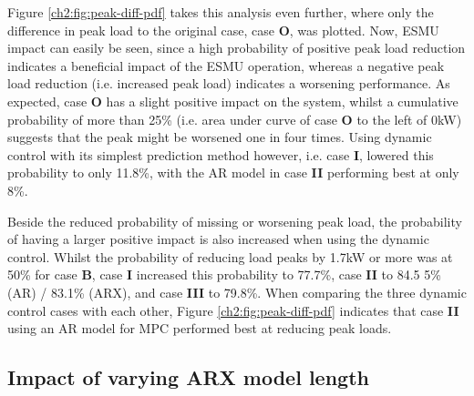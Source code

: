 

Figure \ref{ch2:fig:peak-diff-pdf} takes this analysis even further, where only the difference in peak load to the original case, case \textbf{O}, was plotted.
Now, ESMU impact can easily be seen, since a high probability of positive peak load reduction indicates a beneficial impact of the ESMU operation, whereas a negative peak load reduction (i.e. increased peak load) indicates a worsening performance.
As expected, case \textbf{O} has a slight positive impact on the system, whilst a cumulative probability of more than 25\% (i.e. area under curve of case \textbf{O} to the left of 0kW) suggests that the peak might be worsened one in four times.
Using dynamic control with its simplest prediction method however, i.e. case \textbf{I}, lowered this probability to only 11.8\%, with the AR model in case \textbf{II} performing best at only 8\%.

Beside the reduced probability of missing or worsening peak load, the probability of having a larger positive impact is also increased when using the dynamic control.
Whilst the probability of reducing load peaks by 1.7kW or more was at 50\% for case \textbf{B}, case \textbf{I} increased this probability to 77.7\%, case \textbf{II} to 84.5 5\% (AR) / 83.1\% (ARX), and case \textbf{III} to 79.8\%.
When comparing the three dynamic control cases with each other, Figure \ref{ch2:fig:peak-diff-pdf} indicates that case \textbf{II} using an AR model for MPC performed best at reducing peak loads.

\subsection{Impact of varying ARX model length}





